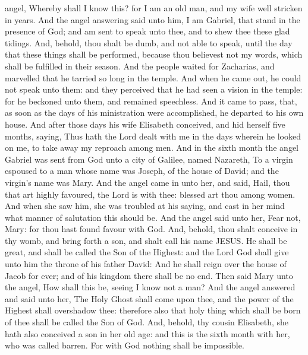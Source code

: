 angel, Whereby shall I know this? for I am an old man, and my wife well
stricken in years.  And the angel answering said unto
him, I am Gabriel, that stand in the presence of God; and am sent to
speak unto thee, and to shew thee these glad tidings. 
And, behold, thou shalt be dumb, and not able to speak, until the day
that these things shall be performed, because thou believest not my
words, which shall be fulfilled in their season.  And the
people waited for Zacharias, and marvelled that he tarried so long in
the temple.  And when he came out, he could not speak
unto them: and they perceived that he had seen a vision in the temple:
for he beckoned unto them, and remained speechless.  And
it came to pass, that, as soon as the days of his ministration were
accomplished, he departed to his own house.  And after
those days his wife Elisabeth conceived, and hid herself five months,
saying,  Thus hath the Lord dealt with me in the days
wherein he looked on me, to take away my reproach among men.
 And in the sixth month the angel Gabriel was sent from
God unto a city of Galilee, named Nazareth,  To a virgin
espoused to a man whose name was Joseph, of the house of David; and the
virgin's name was Mary.  And the angel came in unto her,
and said, Hail, thou that art highly favoured, the Lord is with thee:
blessed art thou among women.  And when she saw him, she
was troubled at his saying, and cast in her mind what manner of
salutation this should be.  And the angel said unto her,
Fear not, Mary: for thou hast found favour with God. 
And, behold, thou shalt conceive in thy womb, and bring forth a son, and
shalt call his name JESUS.  He shall be great, and shall
be called the Son of the Highest: and the Lord God shall give unto him
the throne of his father David:  And he shall reign over
the house of Jacob for ever; and of his kingdom there shall be no end.
 Then said Mary unto the angel, How shall this be, seeing
I know not a man?  And the angel answered and said unto
her, The Holy Ghost shall come upon thee, and the power of the Highest
shall overshadow thee: therefore also that holy thing which shall be
born of thee shall be called the Son of God.  And,
behold, thy cousin Elisabeth, she hath also conceived a son in her old
age: and this is the sixth month with her, who was called barren.
 For with God nothing shall be impossible.

